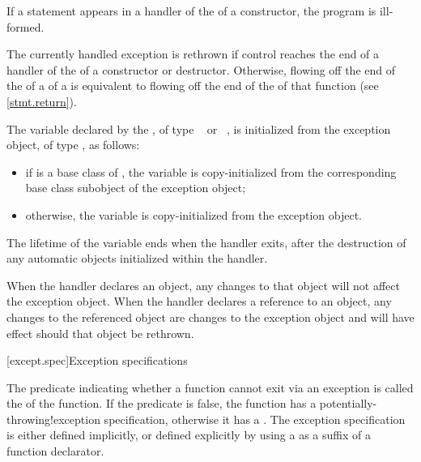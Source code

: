 \pnum
If a  statement appears in a handler of the
of a
constructor, the program is ill-formed.

\pnum
The currently handled exception
is rethrown if control reaches the end of a handler of the
of a constructor or destructor.
Otherwise, flowing off the end of
the 
of a 
of a 
is equivalent to flowing off the end of
the 
of that function (see \ref{stmt.return}).

\pnum
The variable declared by the , of type
\cv{}~ or \cv{}~, is initialized from the exception object,
of type , as follows:
\begin{itemize}
\item
if  is a base class of , the variable is
copy-initialized from the corresponding base class subobject
of the exception object;
\item otherwise, the variable is copy-initialized
from the exception object.
\end{itemize}

The lifetime of the variable ends
when the handler exits, after the
destruction of any automatic objects initialized
within the handler.

\pnum
When the handler declares an object,
any changes to that object will not affect the exception object.
When the handler declares a reference to an object,
any changes to the referenced object are changes to the
exception object and will have effect should that object be rethrown.%
%

[except.spec]{Exception specifications}%

\pnum
The predicate indicating whether a function cannot exit via an exception
is called the  of the function.
If the predicate is false,
the function has a
%
%
{potentially-throwing!exception specification},
otherwise it has a
%
.
The exception specification is either defined implicitly,
or defined explicitly
by using a 
as a suffix of a function declarator.

